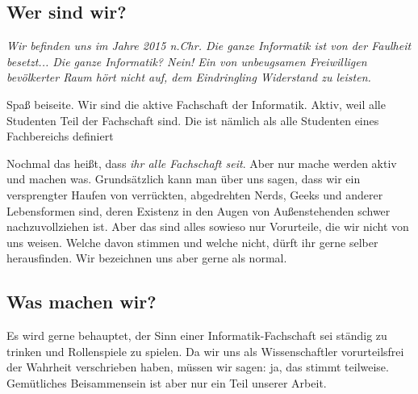 
\subsection{Wer sind wir?}
    \glqq\textit{ Wir befinden uns im Jahre 2015 n.Chr. Die ganze Informatik ist von der Faulheit besetzt... Die ganze Informatik? Nein! Ein von unbeugsamen Freiwilligen bevölkerter Raum hört nicht auf, dem Eindringling  Widerstand zu leisten.} \grqq

    Spaß beiseite. Wir sind die aktive Fachschaft der Informatik. Aktiv, weil alle Studenten Teil der Fachschaft sind. Die ist n\"amlich als alle Studenten eines Fachbereichs definiert

    Nochmal das hei{\ss}t, dass \emph{ihr alle Fachschaft seit}. Aber nur mache werden aktiv und machen was. %
    Grundsätzlich kann man über uns sagen, dass wir ein versprengter Haufen von verrückten, abgedrehten Nerds, Geeks und anderer Lebensformen sind, deren Existenz in den Augen von Außenstehenden schwer nachzuvollziehen ist.
    Aber das sind alles sowieso nur Vorurteile, die wir nicht von uns weisen. Welche davon stimmen und welche nicht, dürft ihr gerne selber herausfinden. Wir bezeichnen uns aber gerne als normal. 	



\subsection{Was machen wir?}
    Es wird gerne behauptet, der Sinn einer Informatik-Fachschaft sei st\"andig zu trinken und Rollenspiele zu spielen.
    Da wir uns als Wissenschaftler vorurteilsfrei der Wahrheit verschrieben haben, m\"ussen wir sagen: ja, das stimmt teilweise.
    Gem\"utliches Beisammensein ist aber nur ein Teil unserer Arbeit.
    
